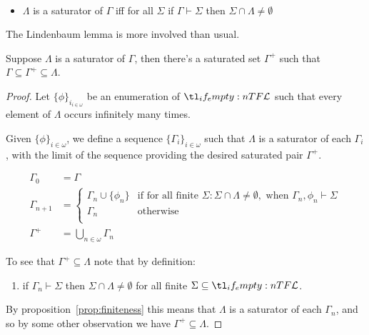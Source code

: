 \documentclass[10pt]{article}
\begin{document}
\begin{definition}[Saturators]
  \mbox{ }
  \begin{itemize}
  \item \(\Lambda\) is a saturator of \(\Gamma\) iff for all \(\Sigma\) if \(\Gamma \vdash \Sigma\) then \(\Sigma \cap \Lambda \ne \emptyset\)
  \end{itemize}
\end{definition}


The Lindenbaum lemma is more involved than usual.

\begin{lemma}[Lindenbaum]\label{lindenbaum:left}
  Suppose \(\Lambda\) is a  saturator of \(\Gamma\), then there's a saturated set \(\Gamma^{+}\) such that \(\Gamma \subseteq \Gamma^{+} \subseteq \Lambda\).
  \begin{proof}
    Let \(\{\phi\}_{i_{i \in \omega}}\) be an enumeration of \(\olang{}\) such that every element of \(\Lambda\) occurs infinitely many times.\nolinebreak

    Given \(\{\phi\}_{i \in \omega}\), we define a sequence \(\{\Gamma_{i}\}_{i \in \omega}\) such that \(\Lambda\) is a saturator of each \(\Gamma_{i}\), with the limit of the sequence providing the desired saturated pair \(\Gamma^{+}\).

    \begin{align*}
      \Gamma_{0} &= \Gamma \\
      \Gamma_{n+1} &=
                     \begin{cases}
                       \Gamma_{n} \cup \{\phi_{n}\} &\text{if for all finite } \Sigma \colon \Sigma \cap \Lambda \ne \emptyset, \text{ when } \Gamma_{n},\phi_{n} \vdash \Sigma \\
                       \Gamma_{n}
                       &\text{otherwise} \\
                     \end{cases}
      \\
      \Gamma^{+} &= \bigcup_{n \in \omega}\Gamma_{n}
    \end{align*}

    To see that \(\Gamma^{+} \subseteq \Lambda\) note that by definition:
    \begin{enumerate}[label=(\arabic*)]
    \item\label{leftLindenbaum:1} if \(\Gamma_{n} \vdash \Sigma\) then \(\Sigma \cap \Lambda \ne \emptyset\) for all finite \(\Sigma \subseteq \olang{}\).
    \end{enumerate}
    By proposition~\ref{prop:finiteness} this means that \(\Lambda\) is a saturator of each \(\Gamma_{n}\), and so by some other observation we have \(\Gamma^{+} \subseteq \Lambda\).


\end{proof}
\end{lemma}
\end{document}
